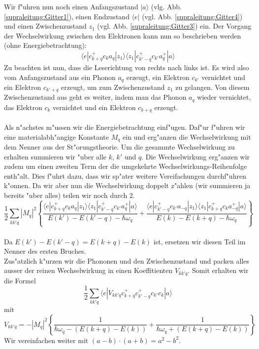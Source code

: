 \begin{refsection}
Wir f"uhren nun noch einen Anfangszustand $|a\rangle$ (vlg. Abb. \ref{supraleitung:Gitter1}), einen Endzustand $\langle e|$ (vgl. Abb. \ref{supraleitung:Gitter4}) und einen Zwischenzustand $z_1$ (vgl. Abb. \ref{supraleitung:Gitter3}) ein. Der Vorgang der Wechselwirkung zwischen den Elektronen kann nun so beschrieben werden (ohne Energiebetrachtung):
\begin{equation}
\langle e|c^+_{k+q} c_k a_q |z_1\rangle\langle z_1| c^+_{k'-q} c_{k'} a^+_q |a\rangle
\label{supraleitung:WechelwirkungOE}
\end{equation}
Zu beachten ist nun, dass die Leserichtung von rechts nach links ist. Es wird also vom Anfangszustand aus ein Phonon $a_q$ erzeugt, ein Elektron $c_{k'}$ vernichtet und ein Elektron $c_{k'+q}$ erzeugt, um zum Zwischenzustand $z_1$ zu gelangen.
Von diesem Zwischenzustand aus geht es weiter, indem man das Phonon $a_q$ wieder vernichtet, das Elektron $c_k$ vernichtet und ein Elektron $c_{k+q}$ erzeugt.
\\
\\
Als n"achstes m"ussen wir die Energiebetrachtung einf"ugen. Daf"ur f"uhren wir eine materialabh"angige Konstante $M_q$ ein und erg"anzen die Wechselwirkung mit dem Nenner aus der St"orungstheorie.
Um die gesammte Wechselwirkung zu erhalten summieren wir "uber alle $k$, $k'$ und $q$. Die Wechselwirkung erg"anzen wir zudem um einen zweiten Term der die umgekehrte Wechselwirkungs-Reihenfolge enth"alt. Dies f"uhrt dazu, dass wir sp"ater weitere Vereifachungen durchf"uhren k"onnen. Da wir aber nun die Wechselwirkung doppelt z"ahlen (wir summieren ja bereits "uber alles) teilen wir noch durch $2$.
\\
\begin{equation}
\frac{1}{2}
\sum \limits_{kk'q} |M_q|^2
\left\{
\frac
{\langle e|c^+_{k+q} c_k a_q |z_1\rangle\langle z_1| c^+_{k'-q} c_{k'} a^+_q |a\rangle }
{E(k')-E(k'-q)-\hbar\omega_q}
+
\frac
{\langle e|c^+_{k'-q} c_{k'} a_{-q}|z_1\rangle\langle z_1| c^+_{k+q} c_k a^+_{-q} |a\rangle }
{E(k)-E(k+q)-\hbar\omega_q}
\right\}
\label{supraleitung:WechelwirkungME}
\end{equation}
\\
Da $E(k')-E(k'-q) = E(k+q)-E(k)$ ist, ersetzen wir diesen Teil im Nenner des ersten Bruches.
\\
Zus"atzlich k"urzen wir die Phononen und den Zwischenzustand und packen alles ausser der reinen Wechselwirkung in einen Koeffitienten $V_{kk'q}$. Somit erhalten wir die Formel
\begin{equation}
\frac{1}{2}
\sum \limits_{kk'q} 
\langle e|V_{kk'q}c^+_{k+q}c^+_{k'-q}c_{k'}c_k|a \rangle
\label{supraleitung:WechelwirkungKurz}
\end{equation}
mit
\begin{equation}
V_{kk'q} = - |M_q|^2 \left\{
\frac{1}{\hbar\omega_q-(E(k+q)-E(k))}
+
\frac{1}{\hbar\omega_q+(E(k+q)-E(k))}
\right\}
\label{supraleitung:WechelwirkungVkk'q}
\end{equation}
Wir vereinfachen weiter mit $(a-b)\cdot (a+b) = a^2-b^2$.


\end{refsection}
